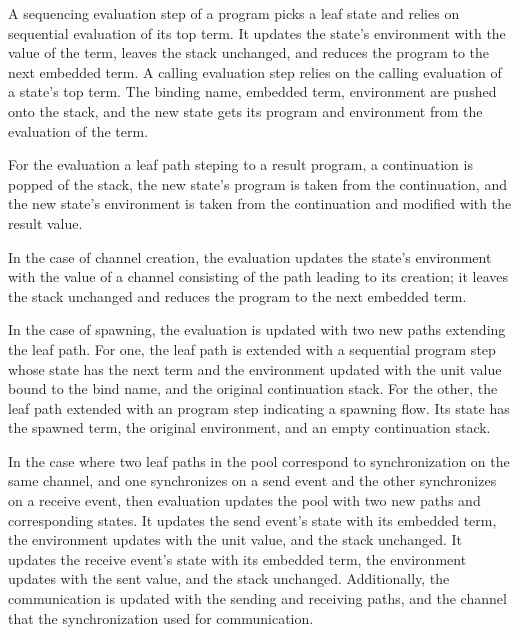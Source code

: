 \documentclass[letterpaper, 11pt]{extarticle}
\begin{document}
A sequencing evaluation step of a program picks a leaf state and relies on
sequential evaluation of its top term. It updates the state's environment with the
value of the term, leaves the stack unchanged, and reduces the program to the next
embedded term. A calling evaluation step relies on the calling evaluation of a state's top
term. The binding name, embedded term, environment are pushed onto the stack, and the new
state gets its program and environment from the evaluation of the term. 

For the evaluation a leaf path steping to a result program, a continuation is popped of the
stack, the new state's program is taken from the continuation, and the new state's environment
is taken from the continuation and modified with the result value.

In the case of channel creation, the evaluation updates the state's environment with the
value of a channel consisting of the path leading to its creation; it leaves the stack
unchanged and reduces the program to the next embedded term.

In the case of spawning, the evaluation is updated with two
new paths extending the leaf path. For one, the leaf path is extended with a sequential
program step whose state has the next term and the environment updated
with the unit value bound to
the bind name, and the original continuation stack. For the other, the leaf path
extended with an program step indicating a spawning flow. Its state has the spawned
term, the original environment, and an empty continuation stack. 

In the case where two leaf paths in the pool correspond to synchronization on the same channel,
and one synchronizes on a send event and the other synchronizes on a receive event, then
evaluation updates the pool with two new paths and corresponding states.
It updates the send event's state with its embedded term, the environment updates with the unit
value, and the stack unchanged. It updates the receive event's state with its embedded term, the
environment updates with the sent value, and the stack unchanged.
Additionally, the communication is updated with the sending and receiving paths, and the channel
that the synchronization used for communication. 
\end{document}
